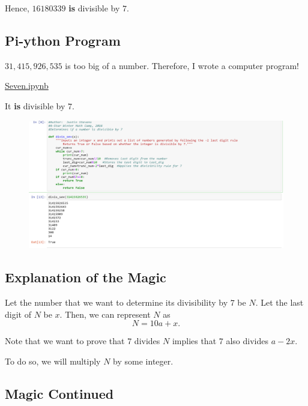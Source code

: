 Hence, $16180339$ \textbf{is} divisible by $7$.

\clearpage

\subsection{Pi-ython Program}

$31,415,926,535$ is too big of a number.  Therefore, I wrote a computer program!

\begin{center} \Huge \href{https://github.com/musichead42/Teaching/blob/master/astar2016wmc/programs/Seven.ipynb}{Seven.ipynb} \end{center}
\normalsize

It \textbf{is} divisible by $7$.

\clearpage

\begin{figure}[h]
	\centering\includegraphics[width=1\linewidth]{images/seven.png}
\end{figure}
\clearpage

\subsection{Explanation of the Magic}

Let the number that we want to determine its divisibility by $7$ be $N$.  Let the last digit of $N$ be $x$.  Then, we can represent $N$ as $$N=10a+x.$$  

Note that we want to prove that $7$ divides $N$ implies that $7$ also divides $a-2x$.  

To do so, we will multiply $N$ by some integer.
\clearpage
\subsection*{Magic Continued}

